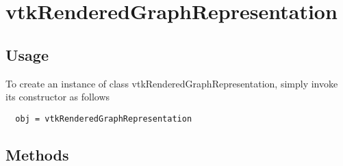 \section{vtkRenderedGraphRepresentation}

\subsection{Usage}


To create an instance of class vtkRenderedGraphRepresentation, simply
invoke its constructor as follows
\begin{verbatim}
  obj = vtkRenderedGraphRepresentation
\end{verbatim}
\subsection{Methods}

